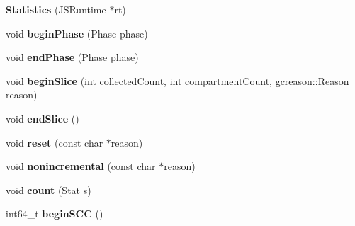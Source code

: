 \begin{DoxyCompactItemize}
\item 
\hypertarget{structjs_1_1gcstats_1_1_statistics_a9558d1bf65cf0632cf1277e265636e2c}{{\bfseries Statistics} (J\-S\-Runtime $\ast$rt)}\label{structjs_1_1gcstats_1_1_statistics_a9558d1bf65cf0632cf1277e265636e2c}

\item 
\hypertarget{structjs_1_1gcstats_1_1_statistics_a29fd2089732b3cebe16e5cba20b67aa1}{void {\bfseries begin\-Phase} (Phase phase)}\label{structjs_1_1gcstats_1_1_statistics_a29fd2089732b3cebe16e5cba20b67aa1}

\item 
\hypertarget{structjs_1_1gcstats_1_1_statistics_a9cb05d5d2b144c0fec2e77796aa6c37b}{void {\bfseries end\-Phase} (Phase phase)}\label{structjs_1_1gcstats_1_1_statistics_a9cb05d5d2b144c0fec2e77796aa6c37b}

\item 
\hypertarget{structjs_1_1gcstats_1_1_statistics_aabf3e7f9fef914b1a42ca2ae6186e1e0}{void {\bfseries begin\-Slice} (int collected\-Count, int compartment\-Count, gcreason\-::\-Reason reason)}\label{structjs_1_1gcstats_1_1_statistics_aabf3e7f9fef914b1a42ca2ae6186e1e0}

\item 
\hypertarget{structjs_1_1gcstats_1_1_statistics_a388a97382c5a3c673f9ca564a145421d}{void {\bfseries end\-Slice} ()}\label{structjs_1_1gcstats_1_1_statistics_a388a97382c5a3c673f9ca564a145421d}

\item 
\hypertarget{structjs_1_1gcstats_1_1_statistics_a9a9f7de8e8e38511b92653ae3f527ca7}{void {\bfseries reset} (const char $\ast$reason)}\label{structjs_1_1gcstats_1_1_statistics_a9a9f7de8e8e38511b92653ae3f527ca7}

\item 
\hypertarget{structjs_1_1gcstats_1_1_statistics_ab71d750226cbb59fd2d0da02285a755c}{void {\bfseries nonincremental} (const char $\ast$reason)}\label{structjs_1_1gcstats_1_1_statistics_ab71d750226cbb59fd2d0da02285a755c}

\item 
\hypertarget{structjs_1_1gcstats_1_1_statistics_aea50e1fa21da3e2770e721401b13457b}{void {\bfseries count} (Stat s)}\label{structjs_1_1gcstats_1_1_statistics_aea50e1fa21da3e2770e721401b13457b}

\item 
\hypertarget{structjs_1_1gcstats_1_1_statistics_a812221f80b7d1d6190cb93b535b62001}{int64\-\_\-t {\bfseries begin\-S\-C\-C} ()}\label{structjs_1_1gcstats_1_1_statistics_a812221f80b7d1d6190cb93b535b62001}


\end{DoxyCompactItemize}
